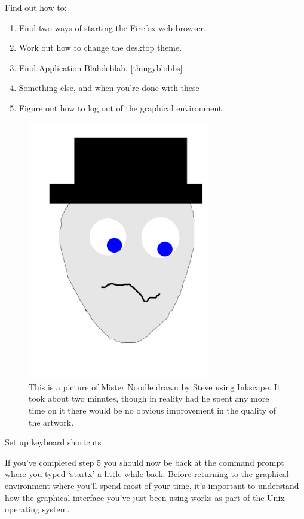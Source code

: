 Find out how to:
\begin{enumerate}
\item Find two ways of starting the Firefox web-browser.
\item Work out how to change the desktop theme. 
\item Find Application Blahdeblah. \ref{thingyblobbs}
\item Something else, and when you're done with these
\item Figure out how to log out of the graphical environment.
\end{enumerate}

\begin{figure}[t]
\centerline{\includegraphics[width=8cm]{images/mrnoodle}}
\caption{This is a picture of Mister Noodle drawn by Steve using Inkscape. It took about two minutes, though in reality had he spent any more time on it there would be no obvious improvement in the quality of the artwork.}\label{figure:mrnoodle}
\end{figure}


\begin{note}
Set up keyboard shortcuts
\end{note}

If you've completed step 5 you should now be back at the command prompt where you typed `startx' a little while back. Before returning to the graphical environment where you'll spend most of your time, it's important to understand how the graphical interface you've just been using works as part of the Unix operating system. 

